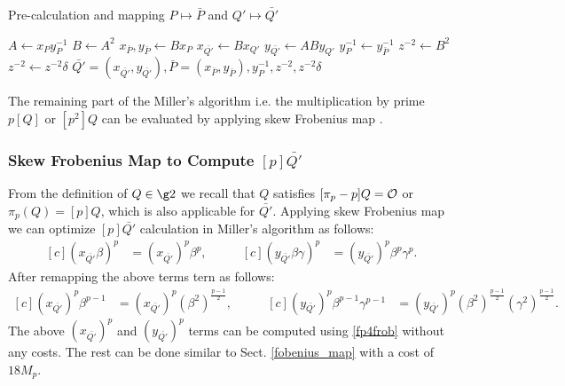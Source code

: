 \begin{algorithm}[!htp]
	\caption{Pre-calculation and mapping $P \mapsto\bar{P}$ and $Q'\mapsto \bar{Q'}$}
	\label{pre_calc_Algo}
	\DontPrintSemicolon
	\hspace{-3ex}
	\hspace{-3ex}
	
	\nl $A \leftarrow x_Py_P^{-1}$ 
	\nl $B \leftarrow A^{2}$  
	\nl $x_{\bar{P}}, y_{\bar{P}} \leftarrow Bx_P$  
	\nl $x_{\bar{Q'}} \leftarrow Bx_{Q'}$ 
	\nl $y_{\bar{Q'}} \leftarrow ABy_{Q'}$ 
	\nl $y_P^{-1} \leftarrow y_{\bar{P}}^{-1}$ 
	\nl $z^{-2} \leftarrow B^2$ 
	\nl $z^{-2} \leftarrow z^{-2}\delta$  
	 $\bar{Q'}=(x_{\bar{Q'}},y_{\bar{Q'}}),\bar{P} = (x_{\bar{P}}, y_{\bar{P}}), y_{P}^{-1}, z^{-2},  z^{-2}\delta $\;
\end{algorithm}
\vspace{8mm}
The remaining part of the Miller's algorithm i.e. the multiplication by prime $p[Q]$ or $[p^2]Q$ can be evaluated by applying skew Frobenius map  \cite{sakemi_skew}.
\subsubsection{Skew Frobenius Map to Compute $[p]\bar{Q'}$}\label{sec_tskew_fm}
From the definition of $Q \in \g2$ we recall that $Q$ satisfies $[\pi_p -p]Q = \cal O$ or $\pi_p(Q) = [p]Q$, which is also applicable for $\bar{Q'}$.
Applying skew Frobenius map we can optimize $[p]\bar{Q'}$ calculation in Miller's algorithm as follows:
\begin{equation*}
\begin{aligned}[c]
(x_{\bar{Q'}}\beta)^p  &=  (x_{\bar{Q'}})^p \beta^p, \nonumber
\end{aligned}
\qquad
\begin{aligned}[c]
(y_{\bar{Q'}}\beta\gamma )^p  &=   (y_{\bar{Q'}})^p \beta^p \gamma^p.  \nonumber 
\end{aligned}
\end{equation*}
After remapping the above terms tern as follows:
\begin{equation*}
\begin{aligned}[c]
(x_{\bar{Q'}})^p \beta^{p-1} & =   (x_{\bar{Q'}})^p (\beta^2)^{\frac{p-1}{2}},
\end{aligned}
\qquad
\begin{aligned}[c]
 (y_{\bar{Q'}})^p \beta^{p-1} \gamma^{p-1}  & = (y_{\bar{Q'}})^p (\beta^2)^{\frac{p-1}{2}} (\gamma^2)^{\frac{p-1}{2}}.
\end{aligned}
\end{equation*}
The above $(x_{\bar{Q'}})^p$ and $(y_{\bar{Q'}})^p$ terms can be computed using \eqref{fp4frob} without any costs.
The rest can be done similar to Sect. \ref{fobenius_map} with a cost of $18M_p$.

